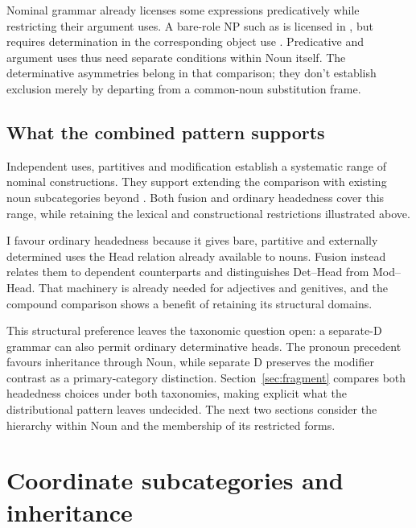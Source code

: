 \documentclass[12pt]{article}
\begin{document}
Nominal grammar already licenses some expressions predicatively while restricting their argument uses. A bare-role NP such as  is licensed in , but requires determination in the corresponding object use  \citep[328]{huddleston2002}. Predicative and argument uses thus need separate conditions within Noun itself. The determinative asymmetries belong in that comparison; they don't establish exclusion merely by departing from a common-noun substitution frame.

\subsection{What the combined pattern supports}\label{sec:cumulative}

Independent uses, partitives and modification establish a systematic range of nominal constructions. They support extending the comparison with existing noun subcategories beyond . Both fusion and ordinary headedness cover this range, while retaining the lexical and constructional restrictions illustrated above.

I favour ordinary headedness because it gives bare, partitive and externally determined uses the Head relation already available to nouns. Fusion instead relates them to dependent counterparts and distinguishes Det--Head from Mod--Head. That machinery is already needed for adjectives and genitives, and the compound comparison shows a benefit of retaining its structural domains.

This structural preference leaves the taxonomic question open: a separate-D grammar can also permit ordinary determinative heads. The pronoun precedent favours inheritance through Noun, while separate D preserves the modifier contrast as a primary-category distinction. Section~\ref{sec:fragment} compares both headedness choices under both taxonomies, making explicit what the distributional pattern leaves undecided. The next two sections consider the hierarchy within Noun and the membership of its restricted forms.

\section{Coordinate subcategories and inheritance}\label{sec:inheritance}
\end{document}
